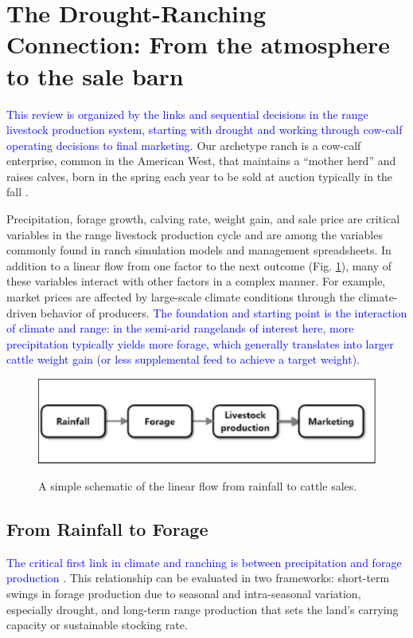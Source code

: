 \documentclass[11pt]{article}
\begin{document}
\section{The Drought-Ranching Connection: From the atmosphere to the sale barn}
\textcolor{blue}{This review is organized by the links and sequential decisions in the range livestock production system, starting with drought and working through cow-calf operating decisions to final marketing.} Our archetype ranch is a cow-calf enterprise, common in the American West, that maintains a ``mother herd'' and raises calves, born in the spring each year to be sold at auction typically in the fall \citep{Tess2000}.

Precipitation, forage growth, calving rate, weight gain, and sale price are critical variables in the range livestock production cycle and are among the variables commonly found in ranch simulation models and management spreadsheets. In addition to a linear flow from one factor to the next outcome (Fig. \ref{rainfall_to_marketing}), many of these variables interact with other factors in a complex manner. For example, market prices are affected by large-scale climate conditions through the climate-driven behavior of producers. \textcolor{blue}{The foundation and starting point is the interaction of climate and range: in the semi-arid rangelands of interest here, more precipitation typically yields more forage, which generally translates into larger cattle weight gain (or less supplemental feed to achieve a target weight).}

\begin{figure}
\includegraphics[scale=1]{rainfall_to_marketing}
\label{rainfall_to_marketing}
\caption{A simple schematic of the linear flow from rainfall to cattle sales.}
\end{figure}
 
\subsection{From Rainfall to Forage}
\textcolor{blue}{The critical first link in climate and ranching is between precipitation and forage production \citep{Cable2009}}. This relationship can be evaluated in two frameworks: short-term swings in forage production due to seasonal and intra-seasonal variation, especially drought, and long-term range production that sets the land's carrying capacity or sustainable stocking rate.
\end{document}
